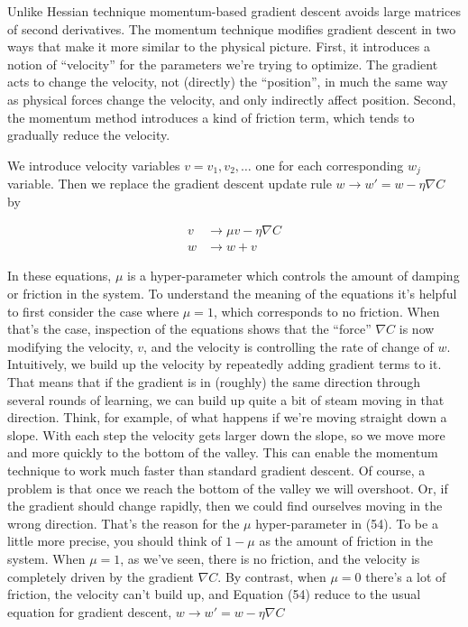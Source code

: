 \documentclass[12 pt]{article}
\begin{document}
Unlike Hessian technique momentum-based gradient descent avoids large
matrices of second derivatives. The momentum technique modifies gradient
descent in two ways that make it more similar to the physical picture.
First, it introduces a notion of ``velocity'' for the parameters we're
trying to optimize. The gradient acts to change the velocity, not
(directly) the ``position'', in much the same way as physical forces
change the velocity, and only indirectly affect position. Second, the
momentum method introduces a kind of friction term, which tends to
gradually reduce the velocity.

We introduce velocity variables $ v = v_1, v_2, \ldots{} $ one for
each corresponding $ w_j $ variable. Then we replace the gradient
descent update rule $ w \to w′ = w - \eta \nabla C $ by

\begin{equation}
    \begin{split}
        v & \to \mu v - \eta \nabla C \\
        w & \to  w + v
    \end{split}
\end{equation}

In these equations, $ \mu $ is a hyper-parameter which controls the
amount of damping or friction in the system. To understand the meaning
of the equations it's helpful to first consider the case where $ \mu =
1 $, which corresponds to no friction. When that's the case,
inspection of the equations shows that the ``force''
$ \nabla C $ is now modifying the velocity, $ v $, and
the velocity is controlling the rate of change of $ w $.
Intuitively, we build up the velocity by repeatedly adding
gradient terms to it. That means that if the gradient is in
(roughly) the same direction through several rounds of learning,
we can build up quite a bit of steam moving in that direction.
Think, for example, of what happens if we're moving straight down a slope.
With each step the velocity gets larger down the slope, so we move more and
more quickly to the bottom of the valley. This can enable the momentum
technique to work much faster than standard gradient descent.
Of course, a problem is that once we reach the bottom of the valley we will overshoot.
Or, if the gradient should change rapidly, then we could find ourselves moving
in the wrong direction. That's the reason for the $ \mu $
hyper-parameter in (54). To be a little more precise, you should
think of $ 1 − \mu $ as the amount of friction in the system. When $
\mu = 1 $, as we've seen, there is no friction, and the velocity
is completely driven by the gradient $ \nabla C $.
By contrast, when $ \mu = 0 $ there's a lot of friction,
the velocity can't build up, and Equation (54) reduce to the
usual equation for gradient descent, $ w\to w′ = w − \eta \nabla C $
\end{document}
